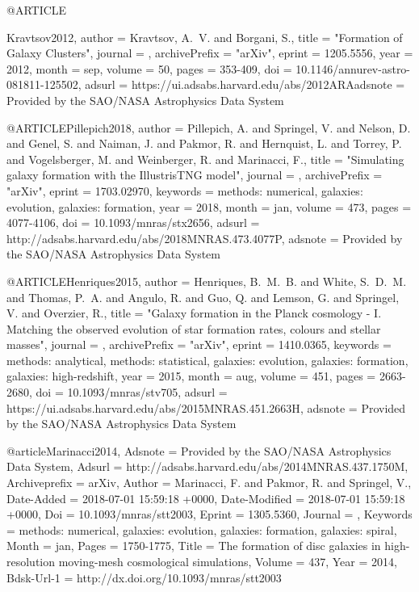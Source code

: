 \documentclass[useAMS,usenatbib]{mnras}
\begin{document}
{{{{{{{{{{{{{{@ARTICLE{Kravtsov2012,
   author = {{Kravtsov}, A.~V. and {Borgani}, S.},
    title = "{Formation of Galaxy Clusters}",
  journal = {\araa},
archivePrefix = "arXiv",
   eprint = {1205.5556},
     year = 2012,
    month = sep,
   volume = 50,
    pages = {353-409},
      doi = {10.1146/annurev-astro-081811-125502},
   adsurl = {https://ui.adsabs.harvard.edu/abs/2012ARAadsnote = {Provided by the SAO/NASA Astrophysics Data System}
}

@ARTICLE{Pillepich2018,
   author = {{Pillepich}, A. and {Springel}, V. and {Nelson}, D. and {Genel}, S. and 
	{Naiman}, J. and {Pakmor}, R. and {Hernquist}, L. and {Torrey}, P. and 
	{Vogelsberger}, M. and {Weinberger}, R. and {Marinacci}, F.},
    title = "{Simulating galaxy formation with the IllustrisTNG model}",
  journal = {\mnras},
archivePrefix = "arXiv",
   eprint = {1703.02970},
 keywords = {methods: numerical, galaxies: evolution, galaxies: formation},
     year = 2018,
    month = jan,
   volume = 473,
    pages = {4077-4106},
      doi = {10.1093/mnras/stx2656},
   adsurl = {http://adsabs.harvard.edu/abs/2018MNRAS.473.4077P},
  adsnote = {Provided by the SAO/NASA Astrophysics Data System}
}

@ARTICLE{Henriques2015,
   author = {{Henriques}, B.~M.~B. and {White}, S.~D.~M. and {Thomas}, P.~A. and 
	{Angulo}, R. and {Guo}, Q. and {Lemson}, G. and {Springel}, V. and 
	{Overzier}, R.},
    title = "{Galaxy formation in the Planck cosmology - I. Matching the observed evolution of star formation rates, colours and stellar masses}",
  journal = {\mnras},
archivePrefix = "arXiv",
   eprint = {1410.0365},
 keywords = {methods: analytical, methods: statistical, galaxies: evolution, galaxies: formation, galaxies: high-redshift},
     year = 2015,
    month = aug,
   volume = 451,
    pages = {2663-2680},
      doi = {10.1093/mnras/stv705},
   adsurl = {https://ui.adsabs.harvard.edu/abs/2015MNRAS.451.2663H},
  adsnote = {Provided by the SAO/NASA Astrophysics Data System}
}

@article{Marinacci2014,
	Adsnote = {Provided by the SAO/NASA Astrophysics Data System},
	Adsurl = {http://adsabs.harvard.edu/abs/2014MNRAS.437.1750M},
	Archiveprefix = {arXiv},
	Author = {{Marinacci}, F. and {Pakmor}, R. and {Springel}, V.},
	Date-Added = {2018-07-01 15:59:18 +0000},
	Date-Modified = {2018-07-01 15:59:18 +0000},
	Doi = {10.1093/mnras/stt2003},
	Eprint = {1305.5360},
	Journal = {\mnras},
	Keywords = {methods: numerical, galaxies: evolution, galaxies: formation, galaxies: spiral},
	Month = jan,
	Pages = {1750-1775},
	Title = {{The formation of disc galaxies in high-resolution moving-mesh cosmological simulations}},
	Volume = 437,
	Year = 2014,
	Bdsk-Url-1 = {http://dx.doi.org/10.1093/mnras/stt2003}
}
	
}}}}}}}}}}}}}}}
\end{document}

